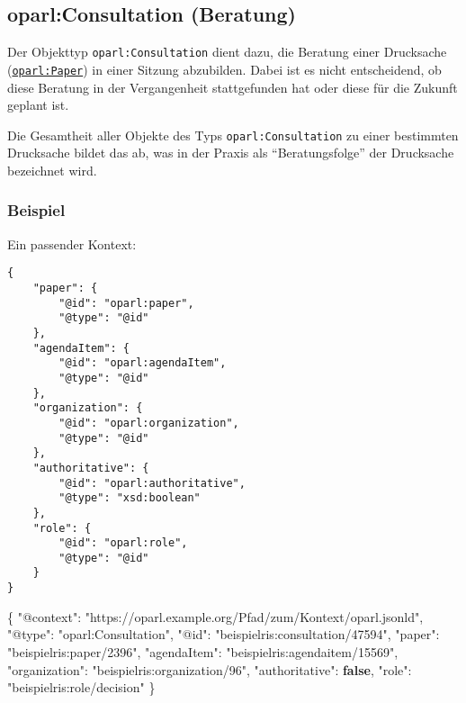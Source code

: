 \documentclass[,a4paper]{article}
\newenvironment{Shaded}{}{}
\newcommand{\KeywordTok}[1]{\textcolor[rgb]{0.00,0.44,0.13}{\textbf{{#1}}}}
\newcommand{\DataTypeTok}[1]{\textcolor[rgb]{0.56,0.13,0.00}{{#1}}}
\newcommand{\StringTok}[1]{\textcolor[rgb]{0.25,0.44,0.63}{{#1}}}
\newcommand{\FunctionTok}[1]{\textcolor[rgb]{0.02,0.16,0.49}{{#1}}}
\begin{document}
\subsection{oparl:Consultation (Beratung)}\label{oparlux5fconsultation}

Der Objekttyp \texttt{oparl:Consultation} dient dazu, die Beratung einer
Drucksache (\hyperref[oparlux5fpaper]{\texttt{oparl:Paper}}) in einer
Sitzung abzubilden. Dabei ist es nicht entscheidend, ob diese Beratung
in der Vergangenheit stattgefunden hat oder diese für die Zukunft
geplant ist.

Die Gesamtheit aller Objekte des Typs \texttt{oparl:Consultation} zu
einer bestimmten Drucksache bildet das ab, was in der Praxis als
``Beratungsfolge'' der Drucksache bezeichnet wird.

\subsubsection{Beispiel}\label{beispiel-8}

Ein passender Kontext:

\begin{verbatim}
{   
    "paper": {
        "@id": "oparl:paper",
        "@type": "@id"
    },
    "agendaItem": {
        "@id": "oparl:agendaItem",
        "@type": "@id"
    },
    "organization": {
        "@id": "oparl:organization",
        "@type": "@id"
    },
    "authoritative": {
        "@id": "oparl:authoritative",
        "@type": "xsd:boolean"
    },
    "role": {
        "@id": "oparl:role",
        "@type": "@id"
    }
}
\end{verbatim}

\begin{Shaded}
\begin{Highlighting}[]
\FunctionTok{\{}
    \DataTypeTok{"@context"}\FunctionTok{:} \StringTok{"https://oparl.example.org/Pfad/zum/Kontext/oparl.jsonld"}\FunctionTok{,}
    \DataTypeTok{"@type"}\FunctionTok{:} \StringTok{"oparl:Consultation"}\FunctionTok{,}
    \DataTypeTok{"@id"}\FunctionTok{:} \StringTok{"beispielris:consultation/47594"}\FunctionTok{,}
    \DataTypeTok{"paper"}\FunctionTok{:} \StringTok{"beispielris:paper/2396"}\FunctionTok{,}
    \DataTypeTok{"agendaItem"}\FunctionTok{:} \StringTok{"beispielris:agendaitem/15569"}\FunctionTok{,}
    \DataTypeTok{"organization"}\FunctionTok{:} \StringTok{"beispielris:organization/96"}\FunctionTok{,}
    \DataTypeTok{"authoritative"}\FunctionTok{:} \KeywordTok{false}\FunctionTok{,}
    \DataTypeTok{"role"}\FunctionTok{:} \StringTok{"beispielris:role/decision"}
\FunctionTok{\}}
\end{Highlighting}
\end{Shaded}
\end{document}
